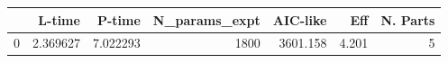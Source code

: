 \begin{tabular}{lrrrrrr}
\toprule
{} &    L-time &    P-time &  N\_params\_expt &  AIC-like &    Eff &  N. Parts \\
\midrule
0 &  2.369627 &  7.022293 &           1800 &  3601.158 &  4.201 &         5 \\
\bottomrule
\end{tabular}
